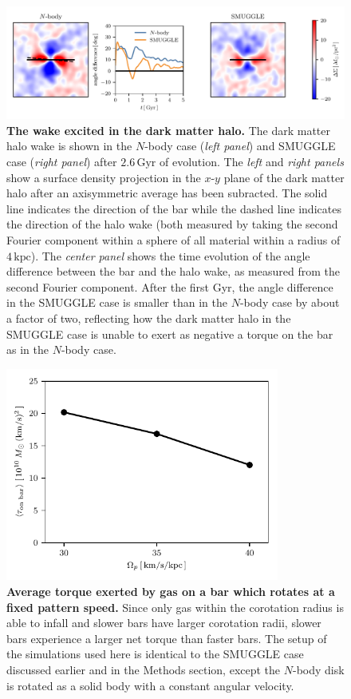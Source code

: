\documentclass{natureprintstyle}
\newcommand{\Nbody}{$N$-body}
\begin{document}
\begin{figure}[h!]%
\centering
\includegraphics[width=18cm]{fig/fig3.pdf}
\caption{\textbf{The wake excited in the dark matter halo.} The dark matter
halo wake is shown in the \Nbody{} case (\textit{left panel}) and SMUGGLE case
(\textit{right panel}) after $2.6\,\textrm{Gyr}$ of evolution. The
\textit{left} and \textit{right panels} show a surface density projection in
the $x$-$y$ plane of the dark matter halo after an axisymmetric average has
been subracted. The solid line indicates the direction of the bar while the
dashed line indicates the direction of the halo wake (both measured by taking
the second Fourier component within a sphere of all material within a radius
of $4\,\textrm{kpc}$). The \textit{center panel} shows the time evolution of
the angle difference between the bar and the halo wake, as measured from the
second Fourier component. After the first Gyr, the angle difference in the
SMUGGLE case is smaller than in the \Nbody{} case by about a factor of two,
reflecting how the dark matter halo in the SMUGGLE case is unable to exert as
negative a torque on the bar as in the \Nbody{} case.}\label{fig:wake}
\end{figure}

\begin{figure}[h!]
\centering
\includegraphics[width=9cm]{fig/fig4.pdf}
\caption{\textbf{Average torque exerted by gas on a bar which rotates at a
fixed pattern speed.} Since only gas within the corotation radius is able to
infall and slower bars have larger corotation radii, slower bars experience a
larger net torque than faster bars. The setup of the simulations used here is
identical to the SMUGGLE case discussed earlier and in the Methods section,
except the \Nbody{} disk is rotated as a solid body with a constant angular
velocity.}\label{fig:equil}
\end{figure}
\end{document}
